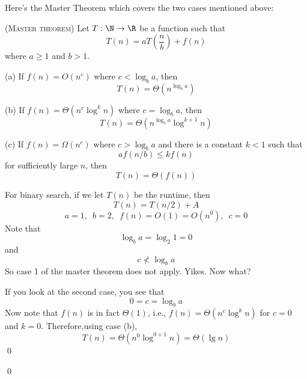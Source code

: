 \begin{comment}
Altogether we have the following.
If $n = b^k$, then
\[
T(n) = a^k T \left( b^0 \right)
 + a^{k-1} f(b^1) + \cdots + a f(b^{k-1}) + f(b^k)
\]
where
\[
a^k T \left( b^0 \right) = \Theta \left( n^{\log_b a} \right)
\]
and if $f(n) = \Theta(n^c)$ where $c = \log_b a$, then
\[
a^{k-1} f(b^1) + \cdots + a f(b^{k-1}) + f(b^k) =
\Theta \left( \log n \cdot  n^{\log_b a}\right)
\]
I conclude that 
\[
T(n)
=
\Theta \left( n^{\log_b a} \log n \right)
\]

Before we celebrate, remember that I made the assumption
\[
f(n) = \Theta(n^c), \,\,\,\,\, c = \log_b a
\]
What if
\[
f(n) = \Theta(n^c), \,\,\,\,\, c \neq \log_b a
\]
We're missing the case $c < \log_b a$ and $c > \log_b a$.
Also, what if $f(n) = O(n^c)$?
Or what if $f(n) = O(\log n)$?
Etc.

Here's the famous \defterm{master theorem} ...

\end{comment}

Here's the Master Theorem which covers the two cases mentioned above:

\begin{thm} \textsc{(Master theorem)}
Let $T : \N \rightarrow \R$ be a function such that
\[
T(n)
= a T \left( \frac{n}{b} \right) + f(n)
\]
where $a \geq 1$ and $b > 1$.
\begin{myenum}
  \item[(a)] If $f(n) = O(n^c)$ where $c <  \log_b a$, then
  \[
  T(n) = \Theta \left( n^{\log_b a} \right)
  \]
  
  \item[(b)] If $f(n) = \Theta(n^c \log^k n)$ where $c = \log_b a$, then
  \[
  T(n) = \Theta \left( n^{\log_b a} \log^{k+1} n \right)
  \]

  \item[(c)] If $f(n) = \Omega(n^c)$ where $c > \log_b a$ and
  there is a constant $k < 1$ such that  
  \[
  a f(n/b) \leq k f(n)
  \]
  for sufficiently large $n$, then
  \[
  T(n) = \Theta(f(n))
  \]
\end{myenum}
\end{thm}

\begin{eg}
  For binary search, if we let $T(n)$ be the runtime, then
  \[
  T(n) = T(n/2) + A
  \]
  \[
  a = 1, \,\,\, b = 2, \,\,\, f(n) = O(1) = O(n^0), \,\,\, c = 0
  \]
  Note that
  \[
  \log_b a = \log_2 1 = 0
  \]
  and
  \[
  c \not< \log_b a
  \]
  So case 1 of the master theorem does not apply.
  Yikes. Now what?
  
  If you look at the second case, you see that
  \[
  0 = c = \log_b a
  \]
  Now note that $f(n)$ is in fact $\Theta(1)$, i.e., $f(n) = \Theta(n^c \log^k n)$
  for $c = 0$ and $k = 0$.
  Therefore,using case (b),
  \[
  T(n) = \Theta(n^0 \log^{0+1} n) = \Theta(\lg n)
  \]
  \qed
\end{eg}
\qed

